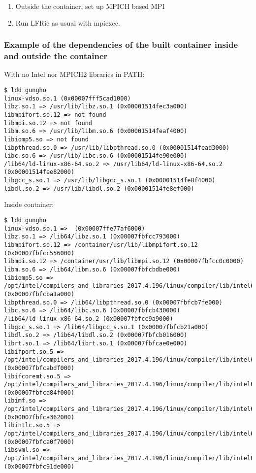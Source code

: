 \documentclass[12pt]{article}
\begin{document}
\begin{enumerate}
\item Outside the container, set up MPICH based MPI
\item Run LFRic as usual with mpiexec.
\end{enumerate}


\subsubsection*{Example of the dependencies of the built container inside and outside the container}

With no Intel nor MPICH2 libraries in PATH:
\begin{lstlisting}[breaklines]
$ ldd gungho 
linux-vdso.so.1 (0x00007fff5cad1000)
libz.so.1 => /usr/lib/libz.so.1 (0x00001514fec3a000)
libmpifort.so.12 => not found
libmpi.so.12 => not found
libm.so.6 => /usr/lib/libm.so.6 (0x00001514feaf4000)
libiomp5.so => not found
libpthread.so.0 => /usr/lib/libpthread.so.0 (0x00001514fead3000)
libc.so.6 => /usr/lib/libc.so.6 (0x00001514fe90e000)
/lib64/ld-linux-x86-64.so.2 => /usr/lib64/ld-linux-x86-64.so.2 (0x00001514fee82000)
libgcc_s.so.1 => /usr/lib/libgcc_s.so.1 (0x00001514fe8f4000)
libdl.so.2 => /usr/lib/libdl.so.2 (0x00001514fe8ef000)
\end{lstlisting}

Inside container:
\begin{lstlisting}[breaklines]
$ ldd gungho
linux-vdso.so.1 =>  (0x00007ffe77af6000)
libz.so.1 => /lib64/libz.so.1 (0x00007fbfcc793000)
libmpifort.so.12 => /container/usr/lib/libmpifort.so.12 (0x00007fbfcc556000)
libmpi.so.12 => /container/usr/lib/libmpi.so.12 (0x00007fbfcc0c0000)
libm.so.6 => /lib64/libm.so.6 (0x00007fbfcbdbe000)
libiomp5.so => /opt/intel/compilers_and_libraries_2017.4.196/linux/compiler/lib/intel64/libiomp5.so (0x00007fbfcba1a000)
libpthread.so.0 => /lib64/libpthread.so.0 (0x00007fbfcb7fe000)
libc.so.6 => /lib64/libc.so.6 (0x00007fbfcb430000)
/lib64/ld-linux-x86-64.so.2 (0x00007fbfcc9a9000)
libgcc_s.so.1 => /lib64/libgcc_s.so.1 (0x00007fbfcb21a000)
libdl.so.2 => /lib64/libdl.so.2 (0x00007fbfcb016000)
librt.so.1 => /lib64/librt.so.1 (0x00007fbfcae0e000)
libifport.so.5 => /opt/intel/compilers_and_libraries_2017.4.196/linux/compiler/lib/intel64/libifport.so.5 (0x00007fbfcabdf000)
libifcoremt.so.5 => /opt/intel/compilers_and_libraries_2017.4.196/linux/compiler/lib/intel64/libifcoremt.so.5 (0x00007fbfca84f000)
libimf.so => /opt/intel/compilers_and_libraries_2017.4.196/linux/compiler/lib/intel64/libimf.so (0x00007fbfca362000)
libintlc.so.5 => /opt/intel/compilers_and_libraries_2017.4.196/linux/compiler/lib/intel64/libintlc.so.5 (0x00007fbfca0f7000)
libsvml.so => /opt/intel/compilers_and_libraries_2017.4.196/linux/compiler/lib/intel64/libsvml.so (0x00007fbfc91de000)

\end{lstlisting}
\end{document}
